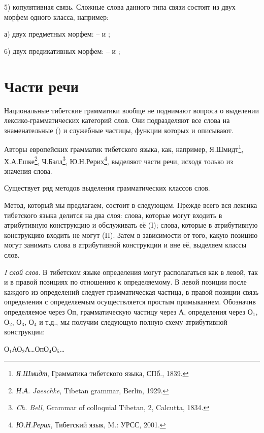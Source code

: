 5) копулятивная связь. Сложные слова данного типа связи состоят из двух морфем одного класса, например:

а) двух предметных морфем:  --  и ;

6)	двух предикативных морфем:  --  и ;

\section{Части речи}

Национальные тибетские грамматики вообще не поднимают вопроса о выделении лексико-грамматических категорий слов. Они подразделяют все слова на знаменательные () и служебные частицы, функции которых и описывают.

Авторы европейских грамматик тибетского языка, как, например,
Я.Шмидт\footnote[20]{\emph{Я.Шмидт}, Грамматика тибетского языка, СПб., 1839.},
Х.А.Ешке\footnote[21]{\emph{Н.А. Jaeschke}, Tibetan grammar, Berlin, 1929.},
Ч.Бэлл\footnote[22]{\emph{Ch. Bell}, Grammar of colloquial Tibetan, 2, Calcutta, 1834.},
Ю.Н.Рерих\footnote[23]{\emph{Ю.Н.Рерих}, Тибетский язык, M.: УРСС, 2001.},
выделяют части речи, исходя только из значения слова.

Существует ряд методов выделения грамматических классов слов.

Метод, который мы предлагаем, состоит в следующем. Прежде всего вся лексика тибетского языка делится на два слоя: слова, которые могут входить в атрибутивную конструкцию и обслуживать её (I); слова, которые в атрибутивную конструкцию входить не могут (II). Затем в зависимости от того, какую позицию могут занимать слова в атрибутивной конструкции и вне её, выделяем классы слов.

\emph{I слой слов}. В тибетском языке определения могут располагаться как в левой, так и в правой позициях по отношению к определяемому. В левой позиции после каждого из определений следует грамматическая частица, в правой позиции связь определения с определяемым осуществляется простым примыканием. Обозначив определяемое через Оп, грамматическую частицу через А, определения через О$_{1}$, О$_{2}$, О$_{3}$, О$_{4}$ и т.д., мы получим следующую полную схему атрибутивной конструкции:
\begin{center}
    О$_{1}$АО$_{2}$А\dots ОпО$_{4}$О$_{5}$\dots
\end{center}


